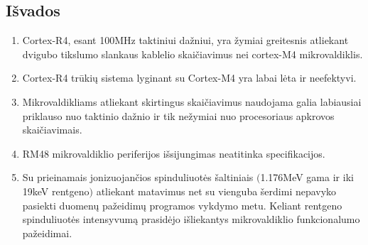\documentclass[a4paper, 12pt]{article} %
\begin{document}
\begin{onehalfspacing}
\section{I\v{s}vados}


\begin{enumerate}
\item Cortex-R4, esant 100MHz taktiniui da\v{z}niui, yra \v{z}ymiai greitesnis atliekant dvigubo tikslumo slankaus kablelio skai\v{c}iavimus nei cortex-M4 mikrovaldiklis.
\item Cortex-R4 tr\=uki\k{u} sistema lyginant su Cortex-M4 yra labai l\.{e}ta ir neefektyvi.
\item Mikrovaldikliams atliekant skirtingus skai\v{c}iavimus naudojama galia labiausiai priklauso nuo taktinio da\v{z}nio ir tik ne\v{z}ymiai nuo procesoriaus apkrovos skai\v{c}iavimais.
\item RM48 mikrovaldiklio periferijos i\v{s}sijungimas neatitinka specifikacijos.
\item Su prieinamais jonizuojan\v{c}ios spinduliuot\.{e}s \v{s}altiniais $($1.176MeV gama ir iki 19keV rentgeno$)$ atliekant matavimus net su vienguba \v{s}erdimi nepavyko pasiekti duomen\k{u} pa\v{z}eidim\k{u} programos vykdymo metu. Keliant rentgeno spinduliuot\.es intensyvum\k{a} prasid\.{e}jo i\v{s}liekantys mikrovaldiklio funkcionalumo pa\v{z}eidimai.
\end{enumerate}


\newpage




\end{onehalfspacing}
\end{document}
